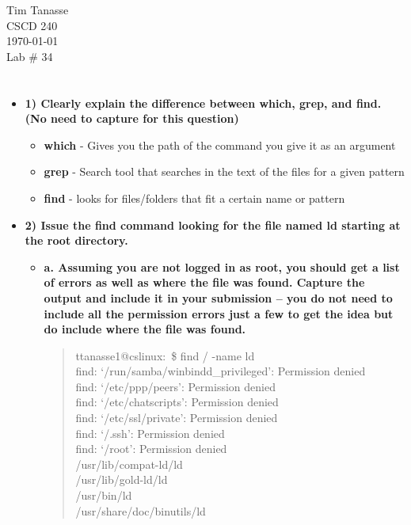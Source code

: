 \documentclass{article}
\begin{document}
\begin{flushright}
  Tim Tanasse\\
  CSCD 240\\
  \today \\
  Lab \# 34 \\
\end{flushright}
\section*{}
\begin{itemize}
  \item \textbf{1) Clearly explain the difference between which,  grep, and find. (No need to capture for this question)}\\
  \begin{itemize}
    \item \textbf{which} - Gives you the path of the command you give it as an argument
    \item \textbf{grep} - Search tool that searches in the text of the files for a given pattern
    \item \textbf{find} - looks for files/folders that fit a certain name or pattern
  \end{itemize}
  \item \textbf{2) Issue the find command looking for the file named ld starting at the root directory.}
  \begin{itemize}
    \item \textbf{a. Assuming you are not logged in as root, you should get a list of errors as well as where the file was found. Capture the output and include it in your submission – you do not need to include all the permission errors just a few to get the idea but do include where the file was found.}
    \begin{quote}
      ttanasse1@cslinux:~\$ find / -name ld\\
      find: `/run/samba/winbindd\_privileged': Permission denied\\
      find: `/etc/ppp/peers': Permission denied\\
      find: `/etc/chatscripts': Permission denied\\
      find: `/etc/ssl/private': Permission denied\\
      find: `/.ssh': Permission denied\\
      find: `/root': Permission denied\\
      /usr/lib/compat-ld/ld\\
      /usr/lib/gold-ld/ld\\
      /usr/bin/ld\\
      /usr/share/doc/binutils/ld\\


\end{quote}
\end{itemize}
\end{itemize}
\end{document}
